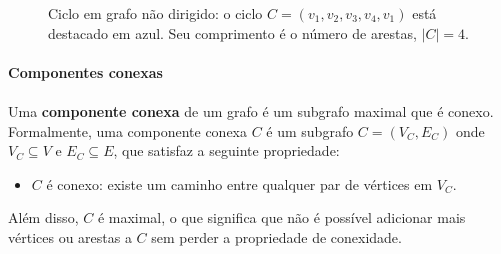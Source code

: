 \documentclass[12pt,a4paper]{article}
\def\\{}%
\begin{document}
\begin{figure}[H]
\centering
{}
\caption{Ciclo em grafo não dirigido: o ciclo $C=(v_1,v_2,v_3,v_4,v_1)$ está destacado em azul. Seu comprimento é o número de arestas, $|C|=4$.}
\label{fig:ciclo}
\end{figure}

\paragraph{Componentes conexas}
\paragraph{}Uma \textbf{componente conexa} de um grafo é um subgrafo maximal que é conexo. Formalmente, uma componente conexa \(C\) é um subgrafo \(C = (V_C, E_C)\) onde \(V_C \subseteq V\) e \(E_C \subseteq E\), que satisfaz a seguinte propriedade:
\begin{itemize}
    \item \(C\) é conexo: existe um caminho entre qualquer par de vértices em \(V_C\).
\end{itemize}
Além disso, \(C\) é maximal, o que significa que não é possível adicionar mais vértices ou arestas a \(C\) sem perder a propriedade de conexidade.
\end{document}
